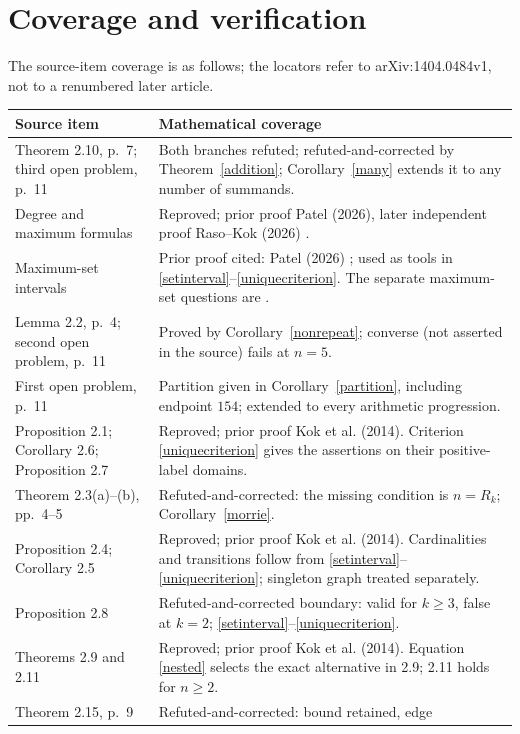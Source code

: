 \documentclass[11pt]{article}
\begin{document}
\section{Coverage and verification}
The source-item coverage is as follows; the locators refer to
arXiv:1404.0484v1, not to a renumbered later article.
\begingroup\small
\begin{longtable}{@{}>{\raggedright\arraybackslash}p{.35\linewidth}>{\raggedright\arraybackslash}p{.60\linewidth}@{}}
\toprule
Source item & Mathematical coverage\\
\midrule
\endhead
Theorem 2.10, p.~7; third open problem, p.~11 & Both branches refuted;
refuted-and-corrected by Theorem~\ref{addition};
Corollary~\ref{many} extends it to any number of summands.\\
Degree and maximum formulas & Reproved; prior proof Patel (2026),
later independent proof Raso--Kok (2026) \cite{patel,raso}.\\
Maximum-set intervals & Prior proof cited: Patel (2026)
\cite{patelsets}; used as tools in \eqref{setinterval}--\eqref{uniquecriterion}.
The separate maximum-set questions are \cite[Conjectures 2.3--2.6]{sequences}.\\
Lemma 2.2, p.~4; second open problem, p.~11 & Proved by
Corollary~\ref{nonrepeat}; converse (not asserted in the source) fails at $n=5$.\\
First open problem, p.~11 & Partition given in
Corollary~\ref{partition}, including endpoint $154$; extended to
every arithmetic progression.\\
Proposition 2.1; Corollary 2.6; Proposition 2.7 & Reproved; prior
proof Kok et al. (2014). Criterion \eqref{uniquecriterion} gives
the assertions on their positive-label domains.\\
Theorem 2.3(a)--(b), pp.~4--5 & Refuted-and-corrected:
the missing condition is $n=R_k$; Corollary~\ref{morrie}.\\
Proposition 2.4; Corollary 2.5 & Reproved; prior proof Kok et al.
(2014). Cardinalities and transitions follow from
\eqref{setinterval}--\eqref{uniquecriterion}; singleton graph treated separately.\\
Proposition 2.8 & Refuted-and-corrected boundary: valid for $k\ge3$,
false at $k=2$; \eqref{setinterval}--\eqref{uniquecriterion}.\\
Theorems 2.9 and 2.11 & Reproved; prior proof Kok et al. (2014).
Equation \eqref{nested} selects the exact alternative in 2.9;
2.11 holds for $n\ge2$.\\
Theorem 2.15, p.~9 & Refuted-and-corrected: bound retained, edge

\end{longtable}
\end{document}
